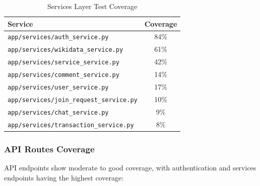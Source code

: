 \documentclass[12pt,a4paper]{report}
\begin{document}
\begin{table}[h]
    \centering
    \begin{tabular}{|l|c|}
        \hline
        \textbf{Service}                                & \textbf{Coverage} \\
        \hline
        \texttt{app/services/auth\_service.py}          & 84\%              \\
        \hline
        \texttt{app/services/wikidata\_service.py}      & 61\%              \\
        \hline
        \texttt{app/services/service\_service.py}       & 42\%              \\
        \hline
        \texttt{app/services/comment\_service.py}       & 14\%              \\
        \hline
        \texttt{app/services/user\_service.py}          & 17\%              \\
        \hline
        \texttt{app/services/join\_request\_service.py} & 10\%              \\
        \hline
        \texttt{app/services/chat\_service.py}          & 9\%               \\
        \hline
        \texttt{app/services/transaction\_service.py}   & 8\%               \\
        \hline
    \end{tabular}
    \caption{Services Layer Test Coverage}
\end{table}

\subsubsection{API Routes Coverage}

API endpoints show moderate to good coverage, with authentication and services endpoints having the highest coverage:
\end{document}
